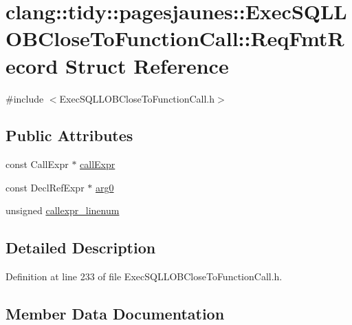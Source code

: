 \hypertarget{structclang_1_1tidy_1_1pagesjaunes_1_1_exec_s_q_l_l_o_b_close_to_function_call_1_1_req_fmt_record}{}\section{clang\+:\+:tidy\+:\+:pagesjaunes\+:\+:Exec\+S\+Q\+L\+L\+O\+B\+Close\+To\+Function\+Call\+:\+:Req\+Fmt\+Record Struct Reference}
\label{structclang_1_1tidy_1_1pagesjaunes_1_1_exec_s_q_l_l_o_b_close_to_function_call_1_1_req_fmt_record}


{\ttfamily \#include $<$Exec\+S\+Q\+L\+L\+O\+B\+Close\+To\+Function\+Call.\+h$>$}

\subsection*{Public Attributes}
\begin{DoxyCompactItemize}
\item 
const Call\+Expr $\ast$ \hyperlink{structclang_1_1tidy_1_1pagesjaunes_1_1_exec_s_q_l_l_o_b_close_to_function_call_1_1_req_fmt_record_a9d8712a1e4a5f7a7b2792bb93a57c1e5}{call\+Expr}
\item 
const Decl\+Ref\+Expr $\ast$ \hyperlink{structclang_1_1tidy_1_1pagesjaunes_1_1_exec_s_q_l_l_o_b_close_to_function_call_1_1_req_fmt_record_ae0aa8567877c8cfd5853368246bba6fd}{arg0}
\item 
unsigned \hyperlink{structclang_1_1tidy_1_1pagesjaunes_1_1_exec_s_q_l_l_o_b_close_to_function_call_1_1_req_fmt_record_a58ffe456f259c1670bd430103a3e0710}{callexpr\+\_\+linenum}
\end{DoxyCompactItemize}


\subsection{Detailed Description}


Definition at line 233 of file Exec\+S\+Q\+L\+L\+O\+B\+Close\+To\+Function\+Call.\+h.



\subsection{Member Data Documentation}
\mbox{\label{structclang_1_1tidy_1_1pagesjaunes_1_1_exec_s_q_l_l_o_b_close_to_function_call_1_1_req_fmt_record_ae0aa8567877c8cfd5853368246bba6fd}} 
